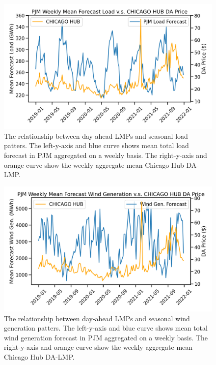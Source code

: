 \begin{figure}[htbp]
    \caption[Total aggregate load v.s. day-ahead prices]{
        The relationship between day-ahead LMPs and seasonal load patters.
        The left-y-axis and blue curve shows mean total load forecast in PJM aggregated on a weekly basis.
        The right-y-axis and orange curve show the weekly aggregate mean Chicago Hub DA-LMP.
    }
    \begin{center}
        \setlength{\fboxsep}{0pt}%
        \setlength{\fboxrule}{1pt}%
        \includegraphics[width=120mm]{figs/load_vs_price}
    \end{center}
    \label{fig:weekly_load}
\end{figure}

\begin{figure}[htbp]
    \caption[Total aggregate wind generation v.s. day-ahead prices]{
        The relationship between day-ahead LMPs and seasonal wind generation patters.
        The left-y-axis and blue curve shows mean total wind generation forecast in PJM aggregated on a weekly basis.
        The right-y-axis and orange curve show the weekly aggregate mean Chicago Hub DA-LMP.
    }
    \begin{center}
        \setlength{\fboxsep}{0pt}%
        \setlength{\fboxrule}{1pt}%
        \includegraphics[width=120mm]{figs/windgen_vs_price}
    \end{center}
    \label{fig:weekly_windgen}
\end{figure}

